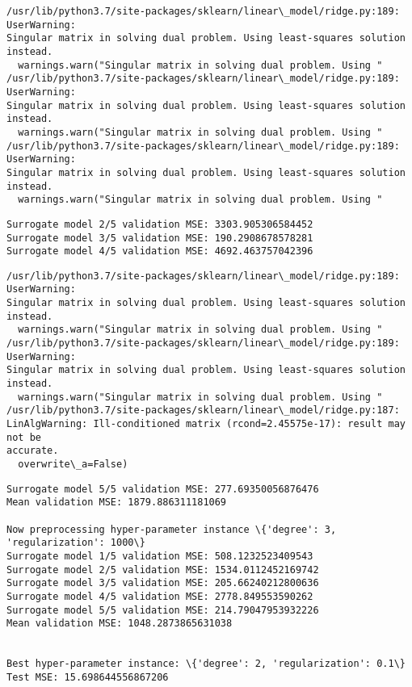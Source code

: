\documentclass[11pt]{article}
\begin{document}
    \begin{Verbatim}[commandchars=\\\{\}]
/usr/lib/python3.7/site-packages/sklearn/linear\_model/ridge.py:189: UserWarning:
Singular matrix in solving dual problem. Using least-squares solution instead.
  warnings.warn("Singular matrix in solving dual problem. Using "
/usr/lib/python3.7/site-packages/sklearn/linear\_model/ridge.py:189: UserWarning:
Singular matrix in solving dual problem. Using least-squares solution instead.
  warnings.warn("Singular matrix in solving dual problem. Using "
/usr/lib/python3.7/site-packages/sklearn/linear\_model/ridge.py:189: UserWarning:
Singular matrix in solving dual problem. Using least-squares solution instead.
  warnings.warn("Singular matrix in solving dual problem. Using "
    \end{Verbatim}

    \begin{Verbatim}[commandchars=\\\{\}]
Surrogate model 2/5 validation MSE: 3303.905306584452
Surrogate model 3/5 validation MSE: 190.2908678578281
Surrogate model 4/5 validation MSE: 4692.463757042396
    \end{Verbatim}

    \begin{Verbatim}[commandchars=\\\{\}]
/usr/lib/python3.7/site-packages/sklearn/linear\_model/ridge.py:189: UserWarning:
Singular matrix in solving dual problem. Using least-squares solution instead.
  warnings.warn("Singular matrix in solving dual problem. Using "
/usr/lib/python3.7/site-packages/sklearn/linear\_model/ridge.py:189: UserWarning:
Singular matrix in solving dual problem. Using least-squares solution instead.
  warnings.warn("Singular matrix in solving dual problem. Using "
/usr/lib/python3.7/site-packages/sklearn/linear\_model/ridge.py:187:
LinAlgWarning: Ill-conditioned matrix (rcond=2.45575e-17): result may not be
accurate.
  overwrite\_a=False)
    \end{Verbatim}

    \begin{Verbatim}[commandchars=\\\{\}]
Surrogate model 5/5 validation MSE: 277.69350056876476
Mean validation MSE: 1879.886311181069

Now preprocessing hyper-parameter instance \{'degree': 3, 'regularization': 1000\}
Surrogate model 1/5 validation MSE: 508.1232523409543
Surrogate model 2/5 validation MSE: 1534.0112452169742
Surrogate model 3/5 validation MSE: 205.66240212800636
Surrogate model 4/5 validation MSE: 2778.849553590262
Surrogate model 5/5 validation MSE: 214.79047953932226
Mean validation MSE: 1048.2873865631038


Best hyper-parameter instance: \{'degree': 2, 'regularization': 0.1\}
Test MSE: 15.698644556867206
    \end{Verbatim}
\end{document}
